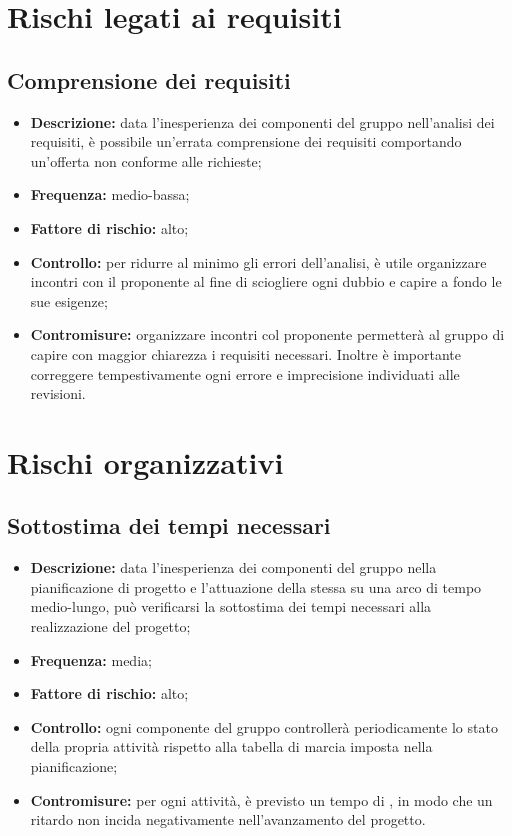 \documentclass[../PianodiProgetto.tex]{subfiles}
\begin{document}
	\section{Rischi legati ai requisiti}
	\subsection{Comprensione dei requisiti}
	\begin{itemize}
		\item \textbf{Descrizione:} data l'inesperienza dei componenti del gruppo nell'analisi dei requisiti, è possibile un'errata comprensione dei requisiti comportando un'offerta non conforme alle richieste;
		\item \textbf{Frequenza:} medio-bassa;
		\item \textbf{Fattore di rischio:} alto;
		\item \textbf{Controllo:} per ridurre al minimo gli errori dell'analisi, è utile organizzare incontri con il proponente al fine di sciogliere ogni dubbio e capire a fondo le sue esigenze;
		\item \textbf{Contromisure:} organizzare incontri col proponente permetterà al gruppo di capire con maggior chiarezza i requisiti necessari. Inoltre è importante correggere tempestivamente ogni errore e imprecisione individuati alle revisioni. 
	\end{itemize}
	
	\section{Rischi organizzativi}
	\subsection{Sottostima dei tempi necessari}
	\begin{itemize}
		\item \textbf{Descrizione:} data l'inesperienza dei componenti del gruppo nella pianificazione di progetto e l'attuazione della stessa su una arco di tempo medio-lungo, può verificarsi la sottostima dei tempi necessari alla realizzazione del progetto;
		\item \textbf{Frequenza:} media;
		\item \textbf{Fattore di rischio:} alto;
		\item \textbf{Controllo:} ogni componente del gruppo controllerà periodicamente lo stato della propria attività rispetto alla tabella di marcia imposta nella pianificazione;
		\item \textbf{Contromisure:} per ogni attività, è previsto un tempo di , in modo che un ritardo non incida negativamente nell'avanzamento del progetto.
	\end{itemize}
\end{document}
